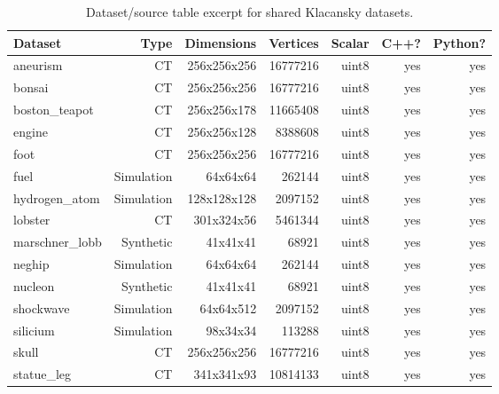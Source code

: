 \begin{table}[htbp]
\centering
\small
\caption{Dataset/source table excerpt for shared Klacansky datasets.}
\label{tab:dataset-source-excerpt}
\begin{tabular}{lrrrrrr}
\hline
Dataset & Type & Dimensions & Vertices & Scalar & C++? & Python? \\
\hline
aneurism & CT & 256x256x256 & 16777216 & uint8 & yes & yes \\
bonsai & CT & 256x256x256 & 16777216 & uint8 & yes & yes \\
boston\_teapot & CT & 256x256x178 & 11665408 & uint8 & yes & yes \\
engine & CT & 256x256x128 & 8388608 & uint8 & yes & yes \\
foot & CT & 256x256x256 & 16777216 & uint8 & yes & yes \\
fuel & Simulation & 64x64x64 & 262144 & uint8 & yes & yes \\
hydrogen\_atom & Simulation & 128x128x128 & 2097152 & uint8 & yes & yes \\
lobster & CT & 301x324x56 & 5461344 & uint8 & yes & yes \\
marschner\_lobb & Synthetic & 41x41x41 & 68921 & uint8 & yes & yes \\
neghip & Simulation & 64x64x64 & 262144 & uint8 & yes & yes \\
nucleon & Synthetic & 41x41x41 & 68921 & uint8 & yes & yes \\
shockwave & Simulation & 64x64x512 & 2097152 & uint8 & yes & yes \\
silicium & Simulation & 98x34x34 & 113288 & uint8 & yes & yes \\
skull & CT & 256x256x256 & 16777216 & uint8 & yes & yes \\
statue\_leg & CT & 341x341x93 & 10814133 & uint8 & yes & yes \\
\hline
\end{tabular}
\end{table}
